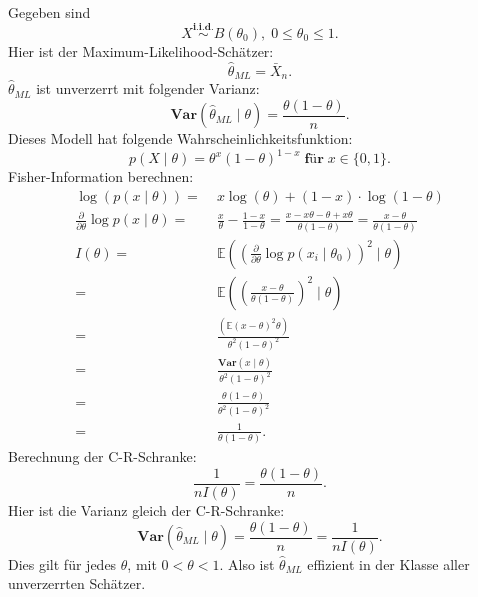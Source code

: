 \documentclass[10pt]{article}
\newcommand{\EW}{\mathbb{E}} %
\newcommand{\ablt}{\frac{\partial}{\partial \theta}}
\newcommand{\Var}{\textbf{Var}} %
\newenvironment{BSP}[1][]
{\begin{Beispiel}[frametitle=#1]}{\end{Beispiel}}
\begin{document}
	\begin{BSP}[Beispiel 1.4.2 (Anwendung C-R-Schranke Bernoulli-Verteilung)]
		Gegeben sind
		\begin{equation*}
			X \overset{\textbf{i.i.d.}}{\sim} B(\theta_0), \; 0 \leq \theta_0 \leq 1.
		\end{equation*}
		Hier ist der Maximum-Likelihood-Schätzer:
		\begin{equation*}
			\hat{\theta}_{ML} = \bar{X}_n.
		\end{equation*}
		$\hat{\theta}_{ML}$ ist unverzerrt mit folgender Varianz:
		\begin{equation*}
			\textbf{Var}(\hat{\theta}_{ML} \mid \theta) = \frac{\theta (1-\theta)}{n}.
		\end{equation*}
		Dieses Modell hat folgende Wahrscheinlichkeitsfunktion:
		\begin{equation*}
			p (X \mid \theta) = \theta^x(1-\theta)^{1-x} \; \textbf{für} \; x \in \{0,1\}.
		\end{equation*}
		Fisher-Information berechnen:
		\begin{equation*}
			\begin{split}
				\log(p(x \mid \theta)) =& \; x \log (\theta) +(1-x) \cdot \log(1-\theta)\\
				\ablt \log p(x \mid \theta) =& \; \frac{x}{\theta} - \frac{1-x}{1-\theta} = \frac{x-x\theta-\theta+x\theta}{\theta (1-\theta)} = \frac{x-\theta}{\theta (1-\theta)}\\
				I(\theta) =& \; \EW \left(\left(\ablt \log p(x_i \mid \theta_0)\right)^2 \mid \theta\right)\\
				=& \; \EW \left(\left(\frac{x-\theta}{\theta(1-\theta)}\right)^2 \mid \theta \right)\\
				=& \; \frac{(\EW(x-\theta)^2 \theta)}{\theta^2 (1-\theta)^2}\\
				=& \; \frac{\textbf{Var}(x\mid \theta)}{\theta^2 (1-\theta)^2}\\ 
				=& \; \frac{\theta(1-\theta)}{\theta^2 (1-\theta)^2}\\
				=& \; \frac{1}{\theta(1-\theta)}.
			\end{split}
		\end{equation*}
		Berechnung der C-R-Schranke:
		\begin{equation*}
			\frac{1}{nI(\theta)} = \frac{\theta(1-\theta)}{n}.
		\end{equation*}
		Hier ist die Varianz gleich der C-R-Schranke:
		\begin{equation*}
			\Var(\hat{\theta}_{ML} \mid \theta) = \frac{\theta(1-\theta)}{n} = \frac{1}{nI(\theta)}.
		\end{equation*}
		Dies gilt für jedes $\theta$, mit $0< \theta <1$. 
		Also ist $\hat{\theta}_{ML}$ effizient in der Klasse aller unverzerrten Schätzer. 
	\end{BSP}
	
\end{document}
